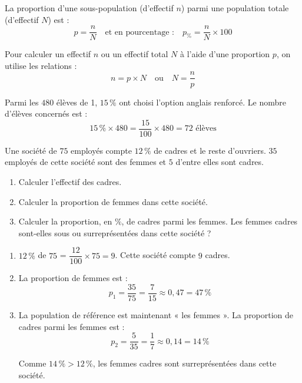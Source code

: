 \begin{prop}
	La proportion d'une sous-population (d'effectif $n$) parmi une population totale (d'effectif $N$) est :
	\[
		{p = \dfrac{n}{N}} \quad \text{et en pourcentage :} \quad {p_{\%}=\dfrac{n}{N}\times 100}
	\]
\end{prop}

\begin{rem}
	Pour calculer un effectif $n$ ou un effectif total $N$ à l'aide d'une proportion $p$, on utilise les relations :
	\[
		{n = p \times N} \quad \text{ou} \quad {N = \dfrac{n}{p}}
	\]
\end{rem}

\begin{ex}
	Parmi les $480$ élèves de 1, $15\,\%$ ont choisi l'option anglais renforcé. Le nombre d'élèves concernés est :
	\[
		15\,\% \times 480 = \dfrac{15}{100} \times 480 = 72 \text{ élèves}
	\]
\end{ex}

\begin{methode}
	Une société de $75$ employés compte $12\,\%$ de cadres et le reste d'ouvriers. $35$ employés de cette société sont des femmes et $5$ d'entre elles sont cadres.
	\begin{enumerate}
		\item Calculer l'effectif des cadres.
		\item Calculer la proportion de femmes dans cette société.
		\item Calculer la proportion, en $\%$, de cadres parmi les femmes. Les femmes cadres sont-elles sous ou surreprésentées dans cette société ?
	\end{enumerate}

	\begin{correction}
		\begin{enumerate}
			\item $12\,\%$ de $75$ = $\dfrac{12}{100} \times 75 = 9$. Cette société compte $9$ cadres.
			\item La proportion de femmes est :
			      \[
				      p_{1} = \dfrac{35}{75} = \dfrac{7}{15} \approx 0,47 = 47\,\%
			      \]

			\item La population de référence est maintenant « les femmes ». La proportion de cadres parmi les femmes est :
			      \[
				      p_{2} = \dfrac{5}{35} = \dfrac{1}{7} \approx 0,14 = 14\,\%
			      \]

			      Comme $14\,\% > 12\,\%$, les femmes cadres sont surreprésentées dans cette société.
		\end{enumerate}
	\end{correction}
\end{methode}

